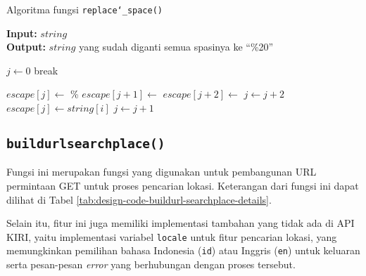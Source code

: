 \begin{algorithm}[h]
	\caption{\textendash\xspace Algoritma fungsi \texttt{replace\char`_space()}}
	\label{alg:design-replacespace}
	\vspace{-0.6\baselineskip}
	\begin{flushleft}
        \textbf{Input:} $string$ \\
        \textbf{Output:} $string$ yang sudah diganti semua spasinya ke ``\%20'' \\
	\end{flushleft}
	\vspace{-1.05\baselineskip}
	\begin{algorithmic}
		\State $j \gets 0$
		 
			 
			    \State break 
			\EndIf
		
			\If{$string[i]$ == \textquotesingle\xspace\textquotesingle}
			    \State $escape[j] \gets$ \textquotesingle\%\textquotesingle
			    \State $escape[j + 1] \gets$ \textquotesingle
			    \State $escape[j + 2] \gets$ \textquotesingle
			    \State $j \gets j + 2$ 
			\Else
				\State $escape[j] \gets string[i]$ 
			\EndIf
			\State $j \gets j + 1$
		\EndFor
		
		\State {}
	\end{algorithmic}
\end{algorithm}

\subsection{\texttt{build\textunderscore url\textunderscore searchplace()}}
\label{sec:design-code-buildurl-searchplace}

Fungsi ini merupakan fungsi yang digunakan untuk pembangunan URL permintaan	GET untuk proses pencarian lokasi. Keterangan dari fungsi ini dapat dilihat di Tabel \ref{tab:design-code-buildurl-searchplace-details}.
	
	Selain itu, fitur ini juga memiliki implementasi tambahan yang tidak ada di API KIRI, yaitu implementasi variabel \verb|locale| untuk fitur pencarian lokasi, yang memungkinkan pemilihan bahasa Indonesia (\verb|id|) atau Inggris (\verb|en|) untuk keluaran serta pesan-pesan \textit{error} yang berhubungan dengan proses tersebut.

